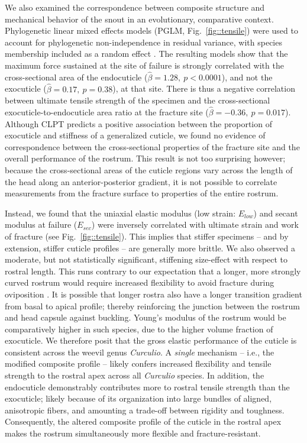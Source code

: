 \documentclass[twocolumn, linenumbers, superscriptaddress, nofootinbib]{revtex4-1}
\begin{document}
		We also examined the correspondence between composite structure and mechanical behavior of the snout in an evolutionary, comparative context.
		Phylogenetic linear mixed effects models (PGLM, Fig.~\ref{fig::tensile}) were used to account for phylogenetic non-independence in residual variance, with species membership included as a random effect \cite{Revell2010, Felsenstein1985}.
		The resulting models show that the maximum force sustained at the site of failure is strongly correlated with the cross-sectional area of the endocuticle ($\hat{\beta}=1.28,~p<0.0001$), and not the exocuticle ($\hat{\beta}=0.17,~p=0.38$), at that site.
		There is thus a negative correlation between ultimate tensile strength of the specimen and the cross-sectional exocuticle-to-endocuticle area ratio at the fracture site ($\hat{\beta}=-0.36,~p=0.017$).
		Although CLPT predicts a positive association between the proportion of exocuticle and stiffness of a generalized cuticle, we found no evidence of correspondence between the cross-sectional properties of the fracture site and the overall performance of the rostrum.
		This result is not too surprising however; because the cross-sectional areas of the cuticle regions vary across the length of the head along an anterior-posterior gradient, it is not possible to correlate measurements from the fracture surface to properties of the entire rostrum.
		
		Instead, we found that the uniaxial elastic modulus (low strain: $E_{low}$) and secant modulus at failure ($E_{sec}$) were inversely correlated with ultimate strain and work of fracture (see Fig.~\ref{fig::tensile}).
		This implies that stiffer specimens -- and by extension, stiffer cuticle profiles -- are generally more brittle.
		We also observed a moderate, but not statistically significant, stiffening size-effect with respect to rostral length.
		This runs contrary to our expectation that a longer, more strongly curved rostrum would require increased flexibility to avoid fracture during oviposition \cite{Hughes2004eco, Bonal2011}.
		It is possible that longer rostra also have a longer transition gradient from basal to apical profile; thereby reinforcing the junction between the rostrum and head capsule against buckling.
		Young's modulus of the rostrum would be comparatively higher in such species, due to the higher volume fraction of exocuticle.
		We therefore posit that the gross elastic performance of the cuticle is consistent across the weevil genus \textit{Curculio}.
		A \emph{single} mechanism -- i.e., the modified composite profile -- likely confers increased flexibility and tensile strength to the rostral apex across all \textit{Curculio} species.
		In addition, the endocuticle demonstrably contributes more to rostral tensile strength than the exocuticle; likely because of its organization into large bundles of aligned, anisotropic fibers, and amounting a trade-off between rigidity and toughness.
		Consequently, the altered composite profile of the cuticle in the rostral apex makes the rostrum simultaneously more flexible and fracture-resistant.
		
\end{document}
